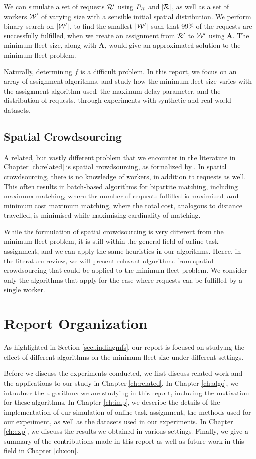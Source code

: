 \documentclass[urop]{socreport}
\begin{document}
We can simulate a set of requests $\mathcal{R}'$ using $P_{\mathcal{R}}$ and $|\mathcal{R}|$, as well as a set of workers $\mathcal{W}'$ of varying size with a sensible initial spatial distribution. We perform binary search on $|\mathcal{W}'|$, to find the smallest $|\mathcal{W}'|$ such that 99\% of the requests are successfully fulfilled, when we create an assignment from $\mathcal{R}'$ to $\mathcal{W}'$ using $\mathbf{A}$. The minimum fleet size, along with $\mathbf{A}$, would give an approximated solution to the minimum fleet problem.

Naturally, determining $f$ is a difficult problem. In this report, we focus on an array of assignment algorithms, and study how the minimum fleet size varies with the assignment algorithm used, the maximum delay parameter, and the distribution of requests, through experiments with synthetic and real-world datasets.

\subsection{Spatial Crowdsourcing}
A related, but vastly different problem that we encounter in the literature in Chapter \ref{ch:related} is spatial crowdsourcing, as formalized by \cite{spatial}. In spatial crowdsourcing, there is no knowledge of workers, in addition to requests as well. This often results in batch-based algorithms for bipartite matching, including maximum matching, where the number of requests fulfilled is maximised, and minimum cost maximum matching, where the total cost, analogous to distance travelled, is minimised while maximising cardinality of matching. 

While the formulation of spatial crowdsourcing is very different from the minimum fleet problem, it is still within the general field of online task assignment, and we can apply the same heuristics in our algorithms. Hence, in the literature review, we will present relevant algorithms from spatial crowdsourcing that could be applied to the minimum fleet problem. We consider only the algorithms that apply for the case where requests can be fulfilled by a single worker.

\section{Report Organization}
As highlighted in Section \ref{sec:findingmfs}, our report is focused on studying the effect of different algorithms on the minimum fleet size under different settings.

Before we discuss the experiments conducted, we first discuss related work and the applications to our study in Chapter \ref{ch:related}. In Chapter \ref{ch:algo}, we introduce the algorithms we are studying in this report, including the motivation for these algorithms. In Chapter \ref{ch:imp}, we describe the details of the implementation of our simulation of online task assignment, the methods used for our experiment, as well as the datasets used in our experiments. In Chapter \ref{ch:exp}, we discuss the results we obtained in various settings. Finally, we give a summary of the contributions made in this report as well as future work in this field in Chapter \ref{ch:con}.
\end{document}
